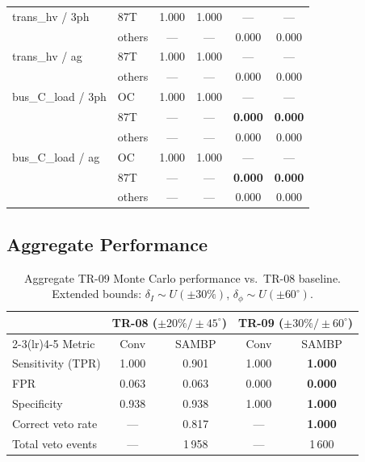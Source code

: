 \documentclass[12pt,a4paper]{article}
\begin{document}
\begin{table}[ht]
\begin{tabular}{llcccc}
trans\_hv / 3ph & 87T   & 1.000 & 1.000 & --- & --- \\
                & others & ---  & ---   & 0.000 & 0.000 \\[2pt]
trans\_hv / ag  & 87T   & 1.000 & 1.000 & --- & --- \\
                & others & ---  & ---   & 0.000 & 0.000 \\[2pt]
bus\_C\_load / 3ph & OC  & 1.000 & 1.000 & --- & --- \\
                   & 87T & ---   & ---   & \textcolor{okgreen}{\textbf{0.000}} & \textcolor{okgreen}{\textbf{0.000}} \\
                   & others & --- & ---  & 0.000 & 0.000 \\[2pt]
bus\_C\_load / ag  & OC  & 1.000 & 1.000 & --- & --- \\
                   & 87T & ---   & ---   & \textcolor{okgreen}{\textbf{0.000}} & \textcolor{okgreen}{\textbf{0.000}} \\
                   & others & --- & ---  & 0.000 & 0.000 \\
\bottomrule
\end{tabular}
\end{table}

\subsection{Aggregate Performance}

\begin{table}[ht]
\centering
\caption{Aggregate TR-09 Monte Carlo performance vs.\ TR-08 baseline.
  Extended bounds: $\delta_I \sim U(\pm30\%)$, $\delta_\phi \sim U(\pm60^\circ)$.}
\label{tab:aggregate}
\begin{tabular}{lcccc}
\toprule
 & \multicolumn{2}{c}{TR-08 ($\pm20\%/\pm45^\circ$)} &
   \multicolumn{2}{c}{TR-09 ($\pm30\%/\pm60^\circ$)} \\
\cmidrule(lr){2-3}\cmidrule(lr){4-5}
Metric & Conv & SAMBP & Conv & SAMBP \\
\midrule
Sensitivity (TPR)   & 1.000 & 0.901 & 1.000 & \textbf{1.000} \\
FPR                 & 0.063 & 0.063 & 0.000 & \textbf{0.000} \\
Specificity         & 0.938 & 0.938 & 1.000 & \textbf{1.000} \\
Correct veto rate   & ---   & 0.817 & ---   & \textbf{1.000} \\
Total veto events   & ---   & 1\,958 & ---  & 1\,600 \\
\bottomrule
\end{tabular}
\end{table}
\end{document}
